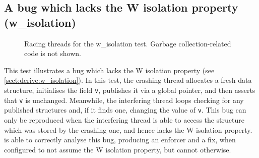 \subsection{A bug which lacks the W isolation property (w\_isolation)}

\begin{figure}
  \centerline{
    {\hfill}
    {\hfill}
    {\hfill}
  }
  \caption{Racing threads for the w\_isolation test.  Garbage
    collection-related code is not shown.}
  \label{fig:w_isolation}
\end{figure}

This test illustrates a bug which lacks the W isolation property (see
\autoref{sect:derive:w_isolation}).  In this test, the crashing thread
allocates a fresh data structure, initialises the field \texttt{v},
publishes it via a global pointer, and then asserts that \texttt{v} is
unchanged.  Meanwhile, the interfering thread loops checking for any
published structures and, if it finds one, changing the value of
\texttt{v}.  This bug can only be reproduced when the interfering
thread is able to access the structure which was stored by the
crashing one, and hence lacks the W isolation property.
{\Implementation} is able to correctly analyse this bug, producing an
enforcer and a fix, when configured to not assume the W isolation
property, but cannot otherwise.

